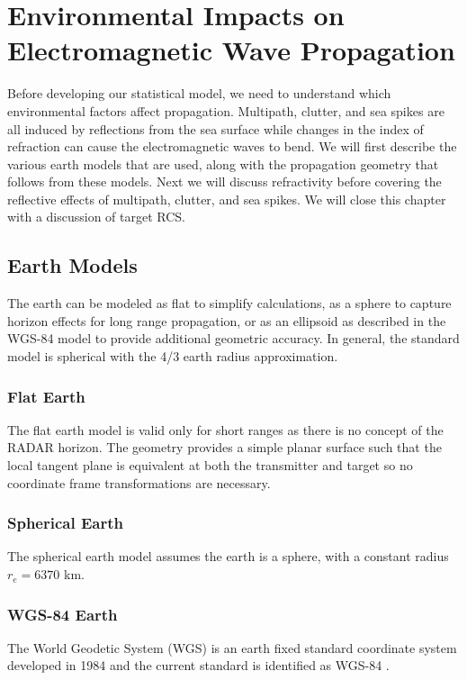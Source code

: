 \renewcommand{\baselinestretch}{2} \small\normalsize
\chapter{Environmental Impacts on Electromagnetic Wave Propagation}
Before developing our statistical model, we need to understand which environmental factors affect propagation. Multipath, clutter, and sea spikes are all induced by reflections from the sea surface while changes in the index of refraction can cause the electromagnetic waves to bend. We will first describe the various earth models that are used, along with the propagation geometry that follows from these models. Next we will discuss refractivity before covering the reflective effects of multipath, clutter, and sea spikes. We will close this chapter with a discussion of target RCS.

\section{Earth Models}
The earth can be modeled as flat to simplify calculations, as a sphere to capture horizon effects for long range propagation, or as an ellipsoid as described in the WGS-84 model to provide additional geometric accuracy. In general, the standard model is spherical with the 4/3 earth radius approximation.

\subsection{Flat Earth}
The flat earth model is valid only for short ranges as there is no concept of the RADAR horizon. The geometry provides a simple planar surface such that the local tangent plane is equivalent at both the transmitter and target so no coordinate frame transformations are necessary.

\subsection{Spherical Earth}
The spherical earth model assumes the earth is a sphere, with a constant radius $r_e = 6370$ km.


\subsection{WGS-84 Earth}
The World Geodetic System (WGS) is an earth fixed standard coordinate system developed in 1984 and the current standard is identified as WGS-84 \cite{dod_wgs84}.


